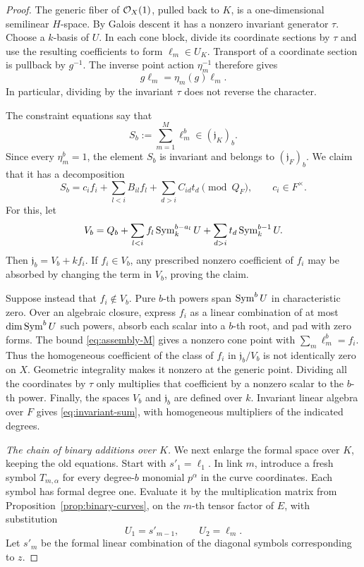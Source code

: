 \begin{proof}
The generic fiber of \(\mathcal O_X(1)\), pulled back to \(K\), is a
one-dimensional semilinear \(H\)-space.  By Galois descent it has a nonzero
invariant generator \(\tau\).
Choose a \(k\)-basis of \(U\).  In each cone block, divide its coordinate
sections by \(\tau\) and use the resulting coefficients to form
\(\ell_m\in U_K\).
Transport of a coordinate section is pullback by \(g^{-1}\).
The inverse point action \(\eta_m^{-1}\) therefore gives
\begin{equation}
 g\ell_m=\eta_m(g)\ell_m.
 \label{eq:leaf-weights}
\end{equation}
In particular, dividing by the invariant \(\tau\) does not reverse the
character.

The constraint equations say that
\[
 S_b:=\sum_{m=1}^M\ell_m^b\in(\mathfrak j_K)_b.
\]
Since every \(\eta_m^b=1\), the element \(S_b\) is invariant and belongs to
\((\mathfrak j_F)_b\).
We claim that it has a decomposition
\begin{equation}
 S_b=c_i f_i+\sum_{l<i}B_{il}f_l+\sum_{d>i}C_{id}t_d
          \pmod{Q_F},\qquad c_i\in F^\times.
 \label{eq:invariant-sum}
\end{equation}
For this, let
\[
 V_b=Q_b+
       \sum_{l<i}f_l\operatorname{Sym}^{b-a_l}_k U+
       \sum_{d>i}t_d\operatorname{Sym}^{b-1}_k U.
\]
Then \(\mathfrak j_b=V_b+kf_i\).
If \(f_i\in V_b\), any prescribed nonzero coefficient of \(f_i\) may be
absorbed by changing the term in \(V_b\), proving the claim.

Suppose instead that \(f_i\notin V_b\).
Pure \(b\)-th powers span \(\operatorname{Sym}^b U\) in characteristic zero.
Over an algebraic closure, express \(f_i\) as a linear combination of at
most \(\dim\operatorname{Sym}^b U\) such powers, absorb each scalar into a \(b\)-th root,
and pad with zero forms.  The bound \eqref{eq:assembly-M} gives a nonzero
cone point with
\(\sum_m\ell_m^b=f_i\).
Thus the homogeneous coefficient of the class of \(f_i\) in
\(\mathfrak j_b/V_b\) is not identically zero on \(X\).
Geometric integrality makes it nonzero at the generic point.
Dividing all the coordinates by \(\tau\) only multiplies that coefficient
by a nonzero scalar to the \(b\)-th power.
Finally, the spaces \(V_b\) and \(\mathfrak j_b\) are defined over \(k\).
Invariant linear algebra over \(F\) gives
\eqref{eq:invariant-sum}, with homogeneous multipliers of the indicated
degrees.

\smallskip\noindent
\emph{The chain of binary additions over \(K\).}
We next enlarge the formal space over \(K\), keeping the old equations.
Start with \(s'_1=\ell_1\).
In link \(m\), introduce a fresh symbol \(T_{m,\alpha}\) for every
degree-\(b\) monomial \(p^\alpha\) in the curve coordinates.
Each symbol has formal degree one.
Evaluate it by the multiplication matrix from
Proposition~\ref{prop:binary-curves}, on the \(m\)-th tensor factor of \(E\),
with substitution
\begin{equation}
 U_1=s'_{m-1},\qquad U_2=\ell_m.
 \label{eq:link-substitution}
\end{equation}
Let \(s'_m\) be the formal linear combination of the diagonal symbols
corresponding to \(z\).


\end{proof}
